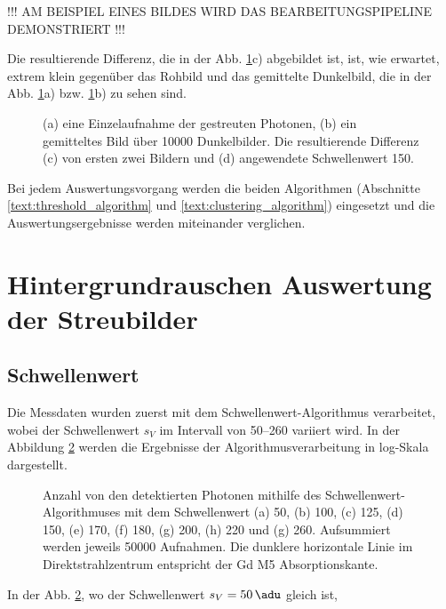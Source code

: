 \noindent
!!! AM BEISPIEL EINES BILDES WIRD DAS BEARBEITUNGSPIPELINE DEMONSTRIERT !!!

Die resultierende Differenz, die in der Abb. \ref{fig:capture_ped_diff}c) abgebildet ist, ist, wie erwartet, extrem klein gegenüber das Rohbild und das gemittelte Dunkelbild, die in der Abb. \ref{fig:capture_ped_diff}a) bzw. \ref{fig:capture_ped_diff}b) zu sehen sind. 
\begin{figure}[H]
    \centering
    
    \caption{(a) eine Einzelaufnahme der gestreuten Photonen, (b) ein gemitteltes Bild über \num{10000} Dunkelbilder.  Die resultierende Differenz (c) von ersten zwei Bildern und (d) angewendete Schwellenwert \SI{150}{\adu}.}
    \label{fig:capture_ped_diff}
\end{figure}

\noindent
Bei jedem Auswertungsvorgang werden die beiden Algorithmen (Abschnitte \ref{text:threshold_algorithm} und \ref{text:clustering_algorithm}) eingesetzt und die Auswertungsergebnisse werden miteinander verglichen.
\section{Hintergrundrauschen Auswertung der Streubilder}
\label{text:streuung_counting}
\subsection{Schwellenwert}
Die Messdaten wurden zuerst mit dem Schwellenwert-Algorithmus verarbeitet, wobei der Schwellenwert $s_V$ im Intervall von \SIrange{50}{260}{\adu} variiert wird. In der Abbildung \ref{fig:th_50_100_125_150_170_180_200_220_260} werden die Ergebnisse der Algorithmusverarbeitung in log-Skala dargestellt.
\begin{figure}[H]
    \centering
    
    \caption{Anzahl von den detektierten Photonen mithilfe des Schwellenwert-Algorithmuses mit dem Schwellenwert (a) \SI{50}{\adu}, (b) \SI{100}{\adu}, (c) \SI{125}{\adu}, (d) \SI{150}{\adu}, (e) \SI{170}{\adu}, (f) \SI{180}{\adu}, (g) \SI{200}{\adu}, (h) \SI{220}{\adu} und (g) \SI{260}{\adu}. Aufsummiert werden jeweils \num{50000} Aufnahmen. Die dunklere horizontale Linie im Direktstrahlzentrum entspricht der Gd M5 Absorptionskante.}
    \label{fig:th_50_100_125_150_170_180_200_220_260}
\end{figure}
%     
\noindent
In der Abb. \ref{fig:th_50_100_125_150_170_180_200_220_260}, wo der Schwellenwert $s_V = \SI{50}{\adu}$ gleich ist, 


